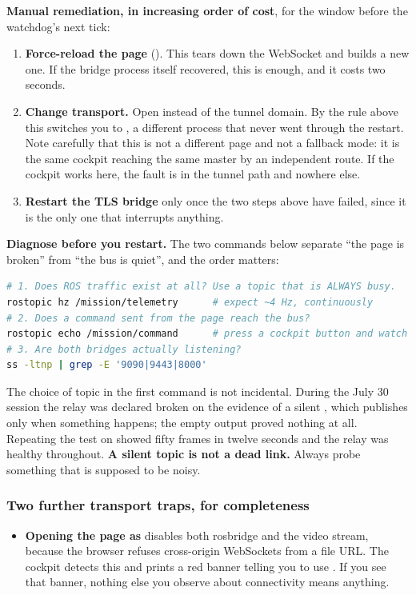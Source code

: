 \noindent\textbf{Manual remediation, in increasing order of cost}, for the
window before the watchdog's next tick:
\begin{enumerate}[leftmargin=1.6em]
\item \textbf{Force-reload the page} (). This tears down
  the WebSocket and builds a new one. If the bridge process itself recovered,
  this is enough, and it costs two seconds.
\item \textbf{Change transport.} Open
   instead of the tunnel domain. By the
  rule above this switches you to , a different process
  that never went through the restart. Note carefully that this is not a
  different page and not a fallback mode: it is the same cockpit reaching the
  same master by an independent route. If the cockpit works here, the fault is
  in the tunnel path and nowhere else.
\item \textbf{Restart the TLS bridge} only once the two steps above have
  failed, since it is the only one that interrupts anything.
\end{enumerate}

\noindent\textbf{Diagnose before you restart.} The two commands below separate
``the page is broken'' from ``the bus is quiet'', and the order matters:

\begin{lstlisting}[language=bash]
# 1. Does ROS traffic exist at all? Use a topic that is ALWAYS busy.
rostopic hz /mission/telemetry      # expect ~4 Hz, continuously
# 2. Does a command sent from the page reach the bus?
rostopic echo /mission/command      # press a cockpit button and watch
# 3. Are both bridges actually listening?
ss -ltnp | grep -E '9090|9443|8000'
\end{lstlisting}

\noindent The choice of topic in the first command is not incidental. During
the July 30 session the relay was declared broken on the evidence of a silent
, which publishes only when something happens; the empty
output proved nothing at all. Repeating the test on 
showed fifty frames in twelve seconds and the relay was healthy throughout.
\textbf{A silent topic is not a dead link.} Always probe something that is
supposed to be noisy.

\subsubsection{Two further transport traps, for completeness}
\begin{itemize}[leftmargin=1.4em]
\item \textbf{Opening the page as } disables both rosbridge and
  the video stream, because the browser refuses cross-origin WebSockets from a
  file URL. The cockpit detects this and prints a red banner telling you to
  use . If you see that banner, nothing
  else you observe about connectivity means anything.
\end{itemize}

